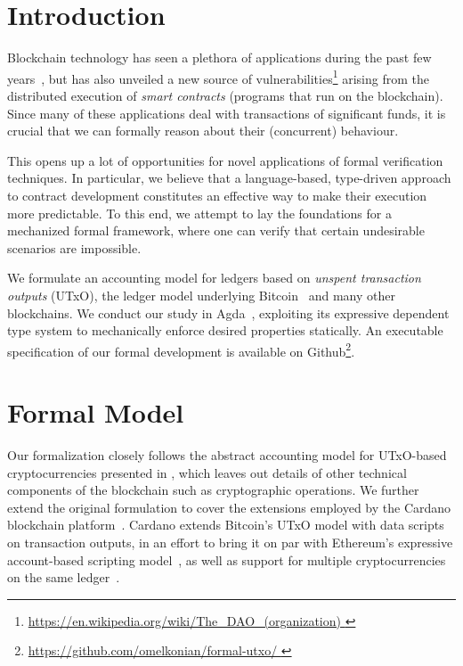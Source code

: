 \documentclass[sigplan,review,screen]{acmart}\settopmatter{printfolios=true,printccs=false,printacmref=false}
\newcommand\site[1]{\footnote{\url{#1}}}
\begin{document}
\section{Introduction}
\label{sec:intro}
Blockchain technology has seen a plethora of applications during the past few years~\cite{mpc,zeroproof,fair},
but has also unveiled a new source of vulnerabilities\site{
https://en.wikipedia.org/wiki/The_DAO_(organization)
} arising from the distributed execution of \textit{smart contracts} (programs that run on the blockchain).
Since many of these applications deal with transactions of significant funds, it is crucial
that we can formally reason about their (concurrent) behaviour.

This opens up a lot of opportunities for novel applications of formal verification techniques.
In particular, we believe that a language-based, type-driven approach to contract development
constitutes an effective way to make their execution more predictable.
To this end, we attempt to lay the foundations for a mechanized formal framework,
where one can verify that certain undesirable scenarios are impossible.

We formulate an accounting model for ledgers based on \textit{unspent transaction outputs} (UTxO),
the ledger model underlying Bitcoin~\cite{bitcoin} and many other blockchains.
We conduct our study in Agda~\cite{agda},
exploiting its expressive dependent type system to mechanically enforce desired properties statically.
An executable specification of our formal development is available on Github\site{
https://github.com/omelkonian/formal-utxo/
}.

\section{Formal Model}
\label{sec:model}
Our formalization closely follows the abstract accounting model for UTxO-based cryptocurrencies presented in \cite{utxo},
which leaves out details of other technical components of the blockchain such as cryptographic operations.
We further extend the original formulation to cover the extensions employed by the Cardano blockchain platform~\cite{eutxo}.
Cardano extends Bitcoin's UTxO model with data scripts on transaction outputs,
in an effort to bring it on par with Ethereum's expressive account-based scripting model~\cite{ethereum},
as well as support for multiple cryptocurrencies on the same ledger~\cite{multicurrency}.
\end{document}

